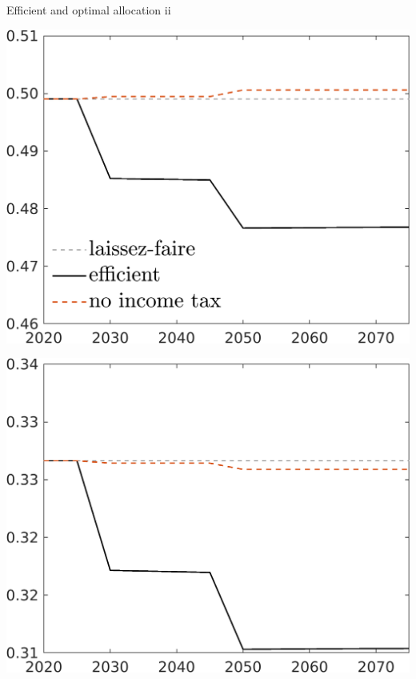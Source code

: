\documentclass[11pt,aspectratio=169]{beamer}
\begin{document}
\begin{frame}{Efficient and optimal allocation ii }
	\centering
	\begin{minipage}[]{0.3\textwidth}
		\includegraphics[width=1\textwidth]{../codding_model/own_basedOnFried/optimalPol_elastS_DisuSci/figures/all_1705/hh_CompEffOPT_T_NoTaus_noopt_spillover0_noskill0_sep1_BN0_ineq0_red0_xgrowth0_zero0_countec0_etaa0.79_lgd1_lff1.png}
	\end{minipage}
	\begin{minipage}[]{0.3\textwidth}
		\includegraphics[width=1\textwidth]{../codding_model/own_basedOnFried/optimalPol_elastS_DisuSci/figures/all_1705/hl_CompEffOPT_T_NoTaus_noopt_spillover0_noskill0_sep1_BN0_ineq0_red0_xgrowth0_zero0_countec0_etaa0.79_lgd0_lff1.png}

\end{minipage}
\end{frame}
\end{document}
